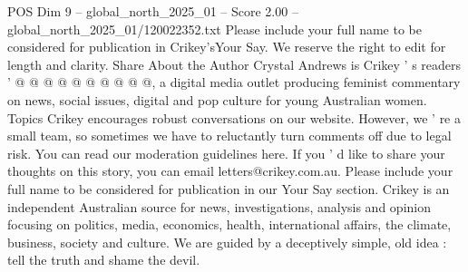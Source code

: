 \begin{textsample}{POS Dim 9 – global\_north\_2025\_01 – Score 2.00 – global\_north\_2025\_01/120022352.txt}
Please include your full name to be considered for publication in Crikey'sYour Say.
We reserve the right to edit for length and clarity.
Share About the Author Crystal Andrews is Crikey ' s readers ' @ @ @ @ @ @ @ @ @ @, a digital media outlet producing feminist commentary on news, social issues, digital and pop culture for young Australian women.
Topics Crikey encourages robust conversations on our website.
However, we ' re a small team, so sometimes we have to reluctantly turn comments off due to legal risk.
You can read our moderation guidelines here.
If you ' d like to share your thoughts on this story, you can email letters@crikey.com.au.
Please include your full name to be considered for publication in our Your Say section.
Crikey is an independent Australian source for news, investigations, analysis and opinion focusing on politics, media, economics, health, international affairs, the climate, business, society and culture.
We are guided by a deceptively simple, old idea : tell the truth and shame the devil.

\end{textsample}
